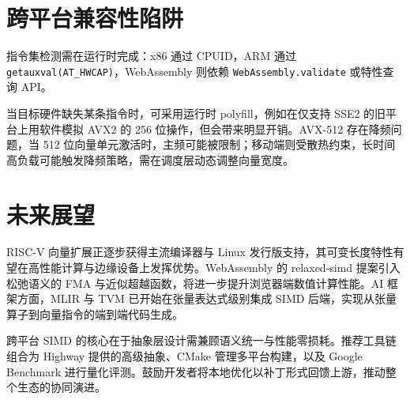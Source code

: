 \chapter{跨平台兼容性陷阱}
指令集检测需在运行时完成：x86 通过 CPUID，ARM 通过 \texttt{getauxval(AT\_{}HWCAP)}，WebAssembly 则依赖 \texttt{WebAssembly.validate} 或特性查询 API。\par
当目标硬件缺失某条指令时，可采用运行时 polyfill，例如在仅支持 SSE2 的旧平台上用软件模拟 AVX2 的 256 位操作，但会带来明显开销。AVX-512 存在降频问题，当 512 位向量单元激活时，主频可能被限制；移动端则受散热约束，长时间高负载可能触发降频策略，需在调度层动态调整向量宽度。\par
\chapter{未来展望}
RISC-V 向量扩展正逐步获得主流编译器与 Linux 发行版支持，其可变长度特性有望在高性能计算与边缘设备上发挥优势。WebAssembly 的 relaxed-simd 提案引入松弛语义的 FMA 与近似超越函数，将进一步提升浏览器端数值计算性能。AI 框架方面，MLIR 与 TVM 已开始在张量表达式级别集成 SIMD 后端，实现从张量算子到向量指令的端到端代码生成。\par
跨平台 SIMD 的核心在于抽象层设计需兼顾语义统一与性能零损耗。推荐工具链组合为 Highway 提供的高级抽象、CMake 管理多平台构建，以及 Google Benchmark 进行量化评测。鼓励开发者将本地优化以补丁形式回馈上游，推动整个生态的协同演进。\par
